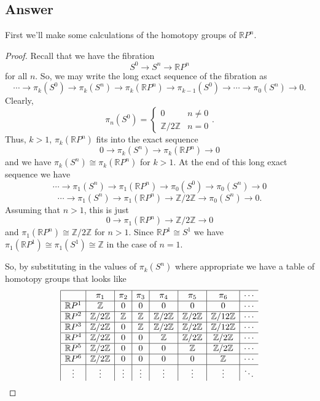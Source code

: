 \documentclass[11pt]{article}
\begin{document}
\subsection{Answer}
First we'll make some calculations of the homotopy groups of $\mathbb{R}P^n$. 

\begin{proof}Recall that we have the fibration
\[S^0 \to  S^n \to \mathbb{R}P^n\]
for all $n$. So, we may write the long exact sequence of the fibration as
\[\cdots \to \pi_k(S^0) \to \pi_k(S^n) \to \pi_k(\mathbb{R}P^n) \to \pi_{k-1}(S^0) \to \cdots \to \pi_0(S^n) \to 0.\]
Clearly, 
\[\pi_n(S^0) = \left\{ \begin{array}{ll} 0 & n \neq 0 \\ \mathbb{Z}/2\mathbb{Z} & n =0 \end{array}\right. . \]
Thus, $k> 1$, $\pi_k(\mathbb{R}P^n)$ fits into the exact sequence
\[0 \to \pi_k(S^n) \to \pi_k(\mathbb{R}P^n) \to 0\]
and we have $\pi_k(S^n) \cong \pi_k(\mathbb{R}P^n)$ for $k>1$. At the end of this long exact sequence we have
\[\cdots \to \pi_1(S^n) \to \pi_1(\mathbb{R}P^n) \to \pi_0(S^0) \to \pi_0(S^n) \to 0\]
\[\cdots \to \pi_1(S^n) \to \pi_1(\mathbb{R}P^n) \to \mathbb{Z}/2\mathbb{Z} \to \pi_0(S^n) \to 0.\]
Assuming that $n > 1$, this is just
\[ 0 \to \pi_1(\mathbb{R}P^n) \to \mathbb{Z}/2\mathbb{Z} \to 0\]
and $\pi_1(\mathbb{R}P^n ) \cong \mathbb{Z} / 2 \mathbb{Z}$ for $n>1$. Since $\mathbb{R}P^1 \cong S^1$ we have $\pi_1(\mathbb{R}P^1) \cong \pi_1(S^1) \cong \mathbb{Z}$ in the case of $n=1$.

So, by substituting in the values of $\pi_k(S^n)$ where appropriate we have a table of homotopy groups that looks like
\[\begin{array}{|c|c|c|c|c|c|c|c}
\hline
&\pi_1&\pi_2&\pi_3&\pi_4&\pi_5&\pi_6& \cdots\\
\hline
\mathbb{R}P^1 &\mathbb{Z}&0&0&0&0&0 &\cdots \\
\hline
\mathbb{R}P^2 & \mathbb{Z}/2\mathbb{Z} &\mathbb{Z}&\mathbb{Z}&\mathbb{Z}/2\mathbb{Z}&\mathbb{Z}/2\mathbb{Z}&\mathbb{Z} /12\mathbb{Z}&\cdots\\
\hline
\mathbb{R}P^3 &  \mathbb{Z}/2\mathbb{Z}&0&\mathbb{Z}&\mathbb{Z}/2\mathbb{Z}&\mathbb{Z}/2\mathbb{Z}& \mathbb{Z}/12\mathbb{Z}&\cdots\\
\hline
\mathbb{R}P^4 &  \mathbb{Z}/2\mathbb{Z}&0&0&\mathbb{Z}&\mathbb{Z}/2\mathbb{Z}&\mathbb{Z}/2\mathbb{Z} &\cdots\\
\hline
\mathbb{R}P^5 &  \mathbb{Z}/2\mathbb{Z}&0&0&0&\mathbb{Z}&\mathbb{Z}/2\mathbb{Z} &\cdots\\
\hline
\mathbb{R}P^6 & \mathbb{Z}/2\mathbb{Z} &0&0&0&0&\mathbb{Z} &\cdots \\
\hline
\vdots&\vdots&\vdots&\vdots&\vdots&\vdots&\vdots&\ddots\\
\end{array}\]
\end{proof}
\end{document}
